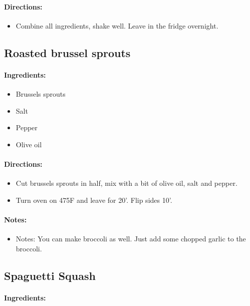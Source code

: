 \documentclass{article}
\begin{document}
\paragraph{Directions:}
\begin{itemize}
	\item Combine all ingredients, shake well. Leave in the fridge overnight.
\end{itemize}

\subsection{Roasted brussel sprouts}

\paragraph{Ingredients:}

\begin{itemize}
	\item Brussels sprouts
	\item Salt
	\item Pepper
	\item Olive oil
\end{itemize}

\paragraph{Directions:}
\begin{itemize}
	\item Cut brussels sprouts in half, mix with a bit of olive oil, salt and pepper.
	\item Turn oven on 475F and leave for 20'. Flip sides 10'.
\end{itemize}

\paragraph{Notes:}
\begin{itemize}
	\item Notes: You can make broccoli as well. Just add some chopped garlic to the broccoli.
\end{itemize}

\subsection{Spaguetti Squash}

\paragraph{Ingredients:}
\end{document}
